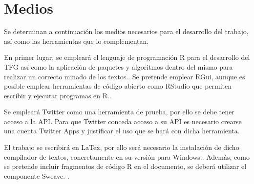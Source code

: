 \section{Medios}
\label{sec:medios}

Se determinan a continuación los medios necesarios para el desarrollo del trabajo, así como las 
herramientas que lo complementan.

En primer lugar, se empleará el lenguaje de programación R para el desarrollo del TFG así como la 
aplicación de paquetes y algoritmos dentro del mismo para realizar un correcto minado de los textos.\cite{r}.
Se pretende emplear RGui, aunque es posible emplear herramientas de código abierto como RStudio que permiten escribir y ejecutar 
programas en R.\cite{rstudio}.

Se empleará Twitter como una herramienta de prueba, por ello se debe tener acceso a la API. Para que 
Twitter conceda acceso a su API es necesario crearse una cuenta Twitter Apps y justificar el uso que se 
hará con dicha herramienta.\cite{api-twitter}

El trabajo se escribirá en LaTex, por ello será necesario la instalación de dicho compilador de textos, 
concretamente en su versión para Windows.\cite{miktext}. Además, como se pretende incluir fragmentos de código R en el documento, 
se deberá utilizar el componente Sweave. \cite{Sweave}.


             





